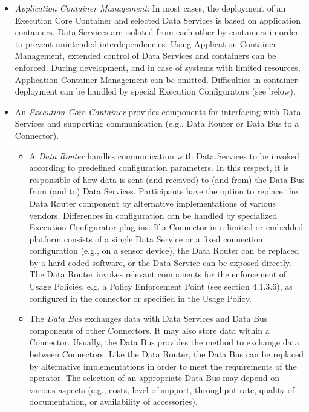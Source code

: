 \begin{itemize}
	\item \textit{Application Container Management}: In most cases, the deployment of an Execution Core Container and selected Data Services is based on application containers. Data Services are isolated from each other by containers in order to prevent unintended interdependencies. Using Application Container Management, extended control of Data Services and containers can be enforced. During development, and in case of systems with limited resources, Application Container Management can be omitted. Difficulties in container deployment can be handled by special Execution Configurators (see below).

	\item An \textit{Execution Core Container} provides components for interfacing with Data Services and supporting communication (e.g., Data Router or Data Bus to a Connector).

	\begin{itemize}
		\item A \textit{Data Router} handles communication with Data Services to be invoked according to predefined configuration parameters. In this respect, it is responsible of how data is sent (and received) to (and from) the Data Bus from (and to) Data Services. Participants have the option to replace the Data Router component by alternative implementations of various vendors. Differences in configuration can be handled by specialized Execution Configurator plug-ins. If a Connector in a limited or embedded platform consists of a single Data Service or a fixed connection configuration (e.g., on a sensor device), the Data Router can be replaced by a hard-coded software, or the Data Service can be exposed directly. The Data Router invokes relevant components for the enforcement of Usage Policies, e.g. a Policy Enforcement Point (see section 4.1.3.6), as configured in the connector or specified in the Usage Policy.

		\item The \textit{Data Bus} exchanges data with Data Services and Data Bus components of other Connectors. It may also store data within a Connector. Usually, the Data Bus provides the method to exchange data between Connectors. Like the Data Router, the Data Bus can be replaced by alternative implementations in order to meet the requirements of the operator. The selection of an appropriate Data Bus may depend on various aspects (e.g., costs, level of support, throughput rate, quality of documentation, or availability of accessories).


\end{itemize}
\end{itemize}
